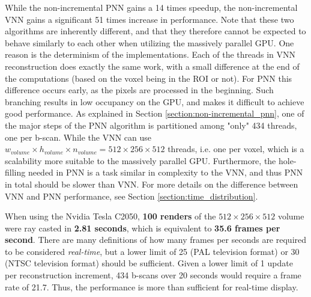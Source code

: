 	While the non-incremental PNN gains a 14 times speedup, the non-incremental VNN gains a significant 51 times increase in performance. Note that these two algorithms are inherently different, and that they therefore cannot be expected to behave similarly to each other when utilizing the massively parallel GPU. One reason is the determinism of the implementations. Each of the threads in VNN reconstruction does exactly the same work, with a small difference at the end of the computations (based on  the voxel being in the ROI or not). For PNN this difference occurs early, as the pixels are processed in the beginning. Such branching results in low occupancy on the GPU, and makes it difficult to achieve good performance. As explained in Section \ref{section:non-incremental_pnn}, one of the major steps of the PNN algorithm is partitioned among "only" 434 threads, one per b-scan. While the VNN can use $w_{volume} \times h_{volume} \times n_{volume} = 512 \times 256 \times 512$ threads, i.e. one per voxel, which is a scalability more suitable to the massively parallel GPU. Furthermore, the hole-filling needed in PNN is a task similar in complexity to the VNN, and thus PNN in total should be slower than VNN. For more details on the difference between VNN and PNN performance, see Section \ref{section:time_distribution}.
	
	
	When using the Nvidia Tesla C2050, \textbf{100 renders} of the $512 \times 256 \times 512$ volume were ray casted in \textbf{2.81 seconds}, which is equivalent to \textbf{35.6 frames per second}. There are many definitions of how many frames per seconds are required to be considered \emph{real-time}, but a lower limit of 25 (PAL television format) or 30 (NTSC television format) should be sufficient. Given a lower limit of 1 update per reconstruction increment, 434 b-scans over 20 seconds would require a frame rate of 21.7. Thus, the performance is more than sufficient for real-time display.

